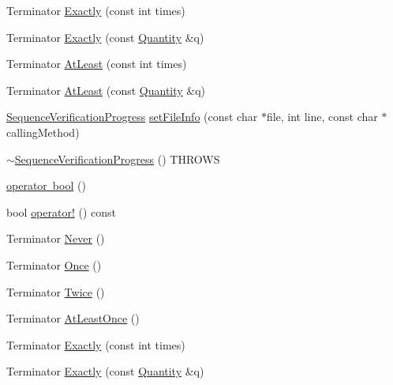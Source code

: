\begin{DoxyCompactItemize}
\item 
Terminator \mbox{\hyperlink{classfakeit_1_1SequenceVerificationProgress_a74c04958c69e3c977ce873de3787305d}{Exactly}} (const int times)
\item 
Terminator \mbox{\hyperlink{classfakeit_1_1SequenceVerificationProgress_abb39ac5b5e16e07b1caaf01325228c47}{Exactly}} (const \mbox{\hyperlink{structfakeit_1_1Quantity}{Quantity}} \&q)
\item 
Terminator \mbox{\hyperlink{classfakeit_1_1SequenceVerificationProgress_a83ba8d481bb79dad783f9bc821dd650e}{At\+Least}} (const int times)
\item 
Terminator \mbox{\hyperlink{classfakeit_1_1SequenceVerificationProgress_a1f6e949249d3f8119e920f6df6f7ade2}{At\+Least}} (const \mbox{\hyperlink{structfakeit_1_1Quantity}{Quantity}} \&q)
\item 
\mbox{\hyperlink{classfakeit_1_1SequenceVerificationProgress}{Sequence\+Verification\+Progress}} \mbox{\hyperlink{classfakeit_1_1SequenceVerificationProgress_aeeadb72fd4e0f52c06fa28c6b54d8188}{set\+File\+Info}} (const char $\ast$file, int line, const char $\ast$calling\+Method)
\item 
\mbox{\hyperlink{classfakeit_1_1SequenceVerificationProgress_a2c3325aa3d50002ef448d31e21494f76}{$\sim$\+Sequence\+Verification\+Progress}} () T\+H\+R\+O\+WS
\item 
\mbox{\hyperlink{classfakeit_1_1SequenceVerificationProgress_a462f6bec1f00814e918f9be6bd5f84e6}{operator bool}} ()
\item 
bool \mbox{\hyperlink{classfakeit_1_1SequenceVerificationProgress_a43f9268650854f97cbae3b28487c2be0}{operator!}} () const
\item 
Terminator \mbox{\hyperlink{classfakeit_1_1SequenceVerificationProgress_ad71678d34cb297945ecad2e1fe825f31}{Never}} ()
\item 
Terminator \mbox{\hyperlink{classfakeit_1_1SequenceVerificationProgress_a4a3260eb1380fcee1c0d8ae162ea57f4}{Once}} ()
\item 
Terminator \mbox{\hyperlink{classfakeit_1_1SequenceVerificationProgress_ac453e14db60c17c23748cc5f4f2325ca}{Twice}} ()
\item 
Terminator \mbox{\hyperlink{classfakeit_1_1SequenceVerificationProgress_a682eed8897bda26aa2927f0a0b03f0b1}{At\+Least\+Once}} ()
\item 
Terminator \mbox{\hyperlink{classfakeit_1_1SequenceVerificationProgress_a74c04958c69e3c977ce873de3787305d}{Exactly}} (const int times)
\item 
Terminator \mbox{\hyperlink{classfakeit_1_1SequenceVerificationProgress_abb39ac5b5e16e07b1caaf01325228c47}{Exactly}} (const \mbox{\hyperlink{structfakeit_1_1Quantity}{Quantity}} \&q)

\end{DoxyCompactItemize}
